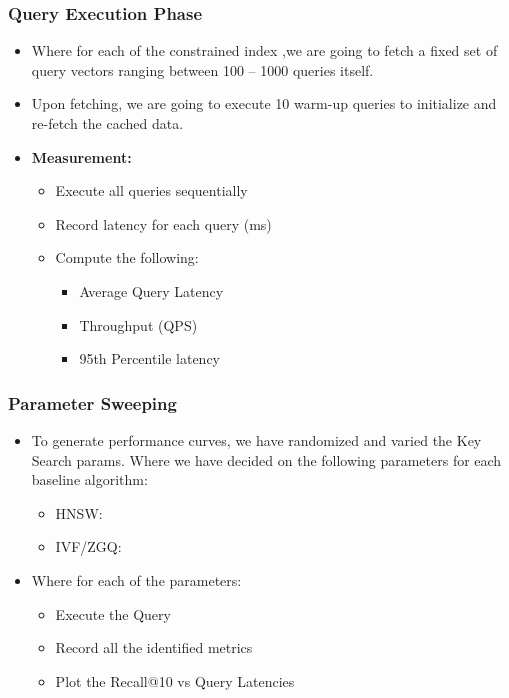\documentclass[conference]{IEEEtran}
\begin{document}
\subsubsection{Query Execution Phase}
\begin{itemize}
    \item Where for each of the constrained index ,we are going to fetch a fixed set of query vectors ranging between 100 – 1000 queries itself.
    \item Upon fetching, we are going to execute 10 warm-up queries to initialize and re-fetch the cached data.
    \item \textbf{Measurement:}
    \begin{itemize}
        \item Execute all queries sequentially
        \item Record latency for each query (ms)
        \item Compute the following:
        \begin{itemize}
            \item Average Query Latency
            \item Throughput (QPS)
            \item 95th Percentile latency
        \end{itemize}
    \end{itemize}
\end{itemize}

\subsubsection{Parameter Sweeping}
\begin{itemize}
    \item To generate performance curves, we have randomized and varied the Key Search params. Where we have decided on the following parameters for each baseline algorithm:
    \begin{itemize}
        \item HNSW:
        \item IVF/ZGQ:
    \end{itemize}
    \item Where for each of the parameters:
    \begin{itemize}
        \item Execute the Query
        \item Record all the identified metrics
        \item Plot the Recall@10 vs Query Latencies
    \end{itemize}
\end{itemize}
\end{document}
